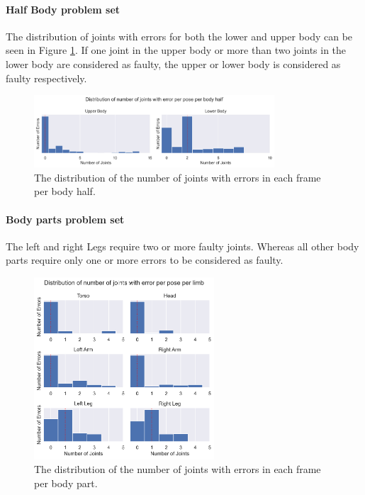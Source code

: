 \paragraph{Half Body problem set}

The distribution of joints with errors for both the lower and upper body can be seen in Figure \ref{fig:dist_bh_epp}. If one joint in the upper body or more than two joints in the lower body are considered as faulty, the upper or lower body is considered as faulty respectively.

\begin{figure}[ht]
  \centering
  \includegraphics[width=0.8\textwidth]{figures/Data/joint_errors_per_pose/distribution_of_joint_errors_per_pose_per_body_half.png}
  \caption[Number of Joints with error per body half]{The distribution of the number of joints with errors in each frame per body half.}
  \label{fig:dist_bh_epp}
\end{figure}

\paragraph{Body parts problem set}

The left and right Legs require two or more faulty joints. Whereas all other body parts require only one or more errors to be considered as faulty. 

\begin{figure}[ht]
  \centering
  \includegraphics[width=0.6\textwidth]{figures/Data/joint_errors_per_pose/distribution_of_joint_errors_per_pose_per_body_part.png}
  \caption[Number of Joints with error per body part]{The distribution of the number of joints with errors in each frame per body part.}
  \label{fig:dist_lb_epp}
\end{figure}

